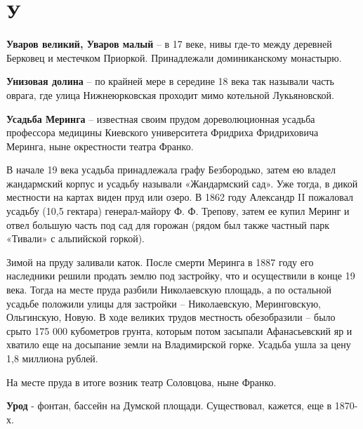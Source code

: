 \chapter*{У}

\textbf{Уваров великий, Уваров малый} – в 17 веке, нивы где-то между деревней Берковец и местечком Приоркой. Принадлежали доминиканскому монастырю.\\

\medskip







\textbf{Унизовая долина} – по крайней мере в середине 18 века так называли часть оврага, где улица Нижнеюрковская проходит мимо котельной Лукьяновской.\\

\medskip

\textbf{Усадьба Меринга} – известная своим прудом дореволюционная усадьба профессора медицины Киевского университета Фридриха Фридриховича Меринга, ныне окрестности театра Франко.

В начале 19 века усадьба принадлежала графу  Безбородько, затем ею владел жандармский корпус и усадьбу называли «Жандармский сад». Уже тогда, в дикой местности на картах виден пруд или озеро. В 1862 году Александр II пожаловал усадьбу (10,5 гектара) гене\-рал-майору Ф. Ф. Трепову, затем ее купил Меринг и отвел большую часть под сад для горожан (рядом был также частный парк «Тивали» с альпийской горкой). 

Зимой на пруду заливали каток. После смерти Меринга в 1887 году его наследники решили продать землю под застройку, что и осуществили в конце 19 века. Тогда на месте пруда разбили Николаевскую площадь, а по остальной усадьбе положили улицы для застройки – Николаевскую, Меринговскую, Ольгинскую, Новую. В ходе великих трудов местность обезобразили – было срыто 175 000 кубометров грунта, которым потом засыпали Афанасьевский яр и хватило еще на досыпание земли на Владимирской горке. Усадьба ушла за цену 1,8 миллиона рублей.

На месте пруда в итоге возник театр Соловцова, ныне Франко.\\

\medskip

\textbf{Урод} - фонтан, бассейн на Думской площади. Существовал, кажется, еще в 1870-х.\\
